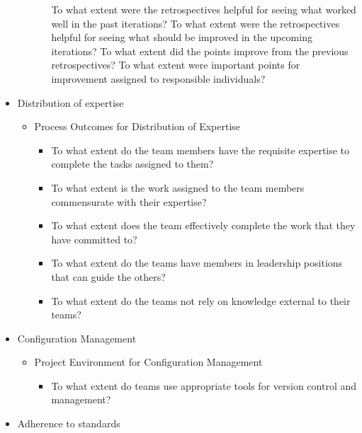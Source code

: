 \begin{appendices}
\begin{itemize}
\begin{itemize}
				\begin{itemize}
					\addition To what extent were the retrospectives helpful for seeing what worked well in the past iterations?
					\addition To what extent were the retrospectives helpful for seeing what should be improved in the upcoming iterations?
					\addition To what extent did the points improve from the previous retrospectives?
				\addition To what extent were important points for improvement assigned to responsible individuals?
				\end{itemize}	 
		\end{itemize}
	\item Distribution of expertise 
		\begin{itemize}
			\item Process Outcomes for Distribution of Expertise
				\begin{itemize}
					\item To what extent do the team members have the requisite expertise to complete the tasks assigned to them? 
					\item To what extent is the work assigned to the team members commensurate with their expertise? 
					\item To what extent does the team effectively complete the work that they have committed to? 
					\item To what extent do the teams have members in leadership positions that can guide the others? 
					\item To what extent do the teams not rely on knowledge external to their teams? 
				\end{itemize}
		\end{itemize}
	\item Configuration Management
		\begin{itemize}
			\item Project Environment for Configuration Management
				\begin{itemize}
					\item To what extent do teams use appropriate tools for version control and management?
				\end{itemize}
		\end{itemize}
	\item Adherence to standards
		\begin{itemize}

\end{itemize}
\end{itemize}
\end{appendices}
